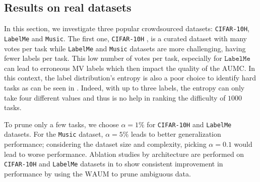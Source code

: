 \subsection{Results on real datasets}
In this section, we investigate three popular crowdsourced datasets: \texttt{CIFAR-10H}, \texttt{LabelMe} and \texttt{Music}.
The first one, \texttt{CIFAR-10H} \citep{peterson_human_2019}, is a curated dataset with many votes per task while \texttt{LabelMe} \citep{rodrigues2018deep} and \texttt{Music} \citep{rodrigues2014gaussian} datasets are more challenging, having fewer labels per task.
This low number of votes per task, especially for $\texttt{LabelMe}$ can lead to erroneous MV labels which then impact the quality of the $\mathrm{AUMC}$. In this context, the label distribution's entropy is also a poor choice to identify hard tasks as can be seen in .
Indeed, with up to three labels, the entropy can only take four different values and thus is no help in ranking the difficulty of $1000$ tasks.

To prune only a few tasks, we choose $\alpha = 1\%$ for \texttt{CIFAR-10H} and \texttt{LabelMe} datasets.
For the \texttt{Music} dataset, $\alpha=5\%$ leads to better generalization performance; considering the dataset size and complexity, picking $\alpha=0.1$ would lead to worse performance.
Ablation studies by architecture are performed on \texttt{CIFAR-10H} and \texttt{LabelMe} datasets in  to show consistent improvement in performance by using the $\mathrm{WAUM}$ to prune ambiguous data.

